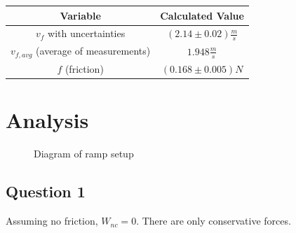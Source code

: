 \documentclass{article}
\begin{document}
\begin{center}
    \begin{tabular}{|c|c|}
        \hline
        Variable                              & Calculated Value              \\
        \hline \hline
        $v_f$ with uncertainties              & $(2.14 \pm 0.02) \frac{m}{s}$ \\
        \hline
        $v_{f,avg}$ (average of measurements) & $1.948 \frac{m}{s}$           \\
        \hline
        $f$ (friction)                        & $(0.168 \pm 0.005)N$          \\
        \hline
    \end{tabular}
\end{center}

\newpage
\section{Analysis}

\begin{figure}[H]
    \centering
    \caption{Diagram of ramp setup}
    \label{fig:diagram}
\end{figure}

\newpage
\subsection{Question 1}

Assuming no friction, $W_{nc} = 0$. There are only conservative forces.
\end{document}

